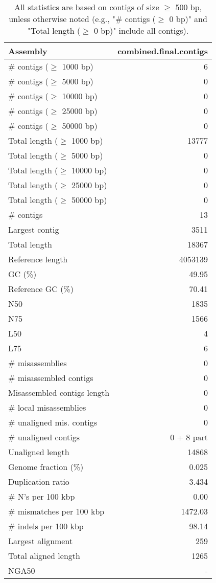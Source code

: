 \documentclass[12pt,a4paper]{article}
\begin{document}
\begin{table}[ht]
\begin{center}
\caption{All statistics are based on contigs of size $\geq$ 500 bp, unless otherwise noted (e.g., "\# contigs ($\geq$ 0 bp)" and "Total length ($\geq$ 0 bp)" include all contigs).}
\begin{tabular}{|l*{1}{|r}|}
\hline
Assembly & combined.final.contigs \\ \hline
\# contigs ($\geq$ 1000 bp) & 6 \\ \hline
\# contigs ($\geq$ 5000 bp) & 0 \\ \hline
\# contigs ($\geq$ 10000 bp) & 0 \\ \hline
\# contigs ($\geq$ 25000 bp) & 0 \\ \hline
\# contigs ($\geq$ 50000 bp) & 0 \\ \hline
Total length ($\geq$ 1000 bp) & 13777 \\ \hline
Total length ($\geq$ 5000 bp) & 0 \\ \hline
Total length ($\geq$ 10000 bp) & 0 \\ \hline
Total length ($\geq$ 25000 bp) & 0 \\ \hline
Total length ($\geq$ 50000 bp) & 0 \\ \hline
\# contigs & 13 \\ \hline
Largest contig & 3511 \\ \hline
Total length & 18367 \\ \hline
Reference length & 4053139 \\ \hline
GC (\%) & 49.95 \\ \hline
Reference GC (\%) & 70.41 \\ \hline
N50 & 1835 \\ \hline
N75 & 1566 \\ \hline
L50 & 4 \\ \hline
L75 & 6 \\ \hline
\# misassemblies & 0 \\ \hline
\# misassembled contigs & 0 \\ \hline
Misassembled contigs length & 0 \\ \hline
\# local misassemblies & 0 \\ \hline
\# unaligned mis. contigs & 0 \\ \hline
\# unaligned contigs & 0 + 8 part \\ \hline
Unaligned length & 14868 \\ \hline
Genome fraction (\%) & 0.025 \\ \hline
Duplication ratio & 3.434 \\ \hline
\# N's per 100 kbp & 0.00 \\ \hline
\# mismatches per 100 kbp & 1472.03 \\ \hline
\# indels per 100 kbp & 98.14 \\ \hline
Largest alignment & 259 \\ \hline
Total aligned length & 1265 \\ \hline
NGA50 & - \\ \hline
\end{tabular}
\end{center}
\end{table}
\end{document}
